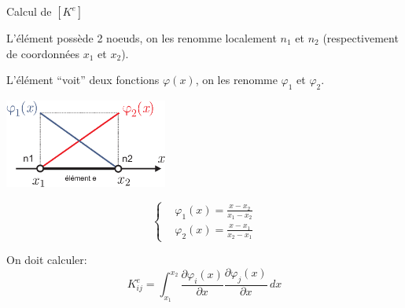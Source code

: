 \documentclass[
mode=present,    %
paper=a4paper,   %
orient=landscape,
display=slides,   %
size=10pt,     %
style=romain   %
]{powerdot}
\begin{document}
\begin{slide}[toc=]{Calcul de $[K^e]$}

L'élément possède 2 noeuds, on les renomme localement $n_1$ et $n_2$ (respectivement de coordonnées $x_1$ et $x_2$).

L'élément ``voit'' deux fonctions $\varphi(x)$, on les renomme $\varphi_1$ et $\varphi_2$.

\bigskip

    \centerline{\includegraphics[width=0.4\textwidth]{Ke2.eps} }


\begin{equation*}
    \left\{
    \begin{aligned}
        &\varphi_1(x) = \frac{x-x_2}{x_1-x_2} \\
        &\varphi_2(x) = \frac{x-x_1}{x_2-x_1}
    \end{aligned}
    \right.
\end{equation*}


On doit calculer:
\begin{equation*}
    K^e_{ij} = \int_{x_1}^{x_2} \frac{\partial\varphi_i(x)}{\partial x}
    \frac{\partial\varphi_j(x)}{\partial x}  \, dx
\end{equation*}

\end{slide}
\end{document}
